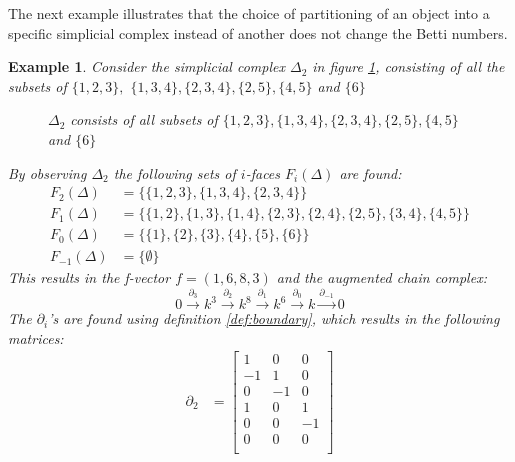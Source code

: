 \documentclass[11pt,a4paper,twoside, openright]{report}
\newtheorem{myex}[mythm]{Example}
\begin{document}
The next example illustrates that the choice of partitioning of an object into a specific simplicial complex instead of another does not change the Betti numbers.
\begin{myex}
Consider the simplicial complex $\Delta_2$ in figure \ref{fig:ex2}, consisting of all the subsets of $\{1,2,3\},$ $\{1,3,4\},\{2,3,4\},\{2,5\},\{4,5\}$ and $\{6\}$
\begin{figure}[H]
\center
{}
\caption{$\Delta_2$ consists of all subsets of $\{1,2,3\},\{1,3,4\},\{2,3,4\},\{2,5\},\{4,5\}$ and $\{6\}$}
\label{fig:ex2}
\end{figure}
By observing $\Delta_2$ the following sets of $i$-faces  $F_i(\Delta)$ are found:
\begin{align*}
F_2(\Delta) &= \{\{1,2,3\},\{1,3,4\},\{2,3,4\}\}\\
F_1(\Delta) &= \{\{1,2\},\{1,3\},\{1,4\},\{2,3\},\{2,4\},\{2,5\},\{3,4\},\{4,5\}\}\\
F_0(\Delta) &= \{\{1\},\{2\},\{3\},\{4\},\{5\},\{6\}\}\\
F_{-1}(\Delta) &= \{\emptyset\}
\end{align*}
This results in the f-vector $f=(1,6,8,3)$ and the augmented chain complex:
\begin{equation*}
0\overset{\partial_3}{\longrightarrow} k^3\overset{\partial_2}{\longrightarrow} k^8\overset{\partial_1}{\longrightarrow} k^6\overset{\partial_0}{\longrightarrow} k \overset{\partial_{-1}}{\longrightarrow} 0
\end{equation*}
The $\partial_i$'s are found using definition \ref{def:boundary}, which results in the following matrices:
\begin{align*}
\partial_2&=
\begin{bmatrix}
1 & 0 & 0 \\
-1 & 1 & 0 \\
0 & -1 & 0 \\
1 & 0 & 1 \\
0 & 0 & -1 \\
0 & 0 & 0 \\

\end{bmatrix}
\end{align*}
\end{myex}
\end{document}
